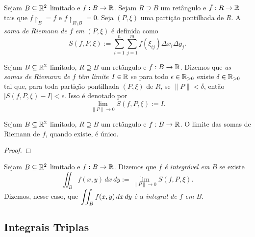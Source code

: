 \begin{definition}
    Sejam $B \subseteq \mathbb{R}^2$ limitado e $f : B \to \mathbb{R}$. Sejam $R \supseteq B$ um retângulo e $\bar{f} : R \to \mathbb{R}$ tais que $\bar{f} \restriction_{B} = f$ e $\bar{f} \restriction_{R \setminus B} = 0$. Seja $(P, \xi)$ uma partição pontilhada de $R$. A \emph{soma de Riemann de $f$ em $(P, \xi)$} é definida como
        \[
            S(f, P, \xi) := \sum_{i=1}^{n} \sum_{j = 1}^{m} \bar{f}(\xi_{ij}) \Delta x_i \Delta y_j.
        \]
\end{definition}

\begin{definition}
    Sejam $B \subseteq \mathbb{R}^2$ limitado, $R \supseteq B$ um retângulo e $f : B \to \mathbb{R}$. Dizemos que \emph{as somas de Riemann de $f$ têm limite $I \in \mathbb{R}$} se para todo $\epsilon \in \mathbb{R}_{>0}$ existe $\delta \in \mathbb{R}_{>0}$ tal que, para toda partição pontilhada $(P, \xi)$ de $R$, se $\|P\| < \delta$, então $|S(f,P,\xi) - I| < \epsilon$. Isso é denotado por
        \[
            \lim_{\|P\| \to 0} S(f,P,\xi) := I.
        \]
\end{definition}

\begin{proposition}
    Sejam $B \subseteq \mathbb{R}^2$ limitado, $R \supseteq B$ um retângulo e $f : B \to \mathbb{R}$. O limite das somas de Riemann de $f$, quando existe, é único.
\end{proposition}

\begin{proof}
    \blackproof
\end{proof}

\begin{definition}
    Sejam $B \subseteq \mathbb{R}^2$ limitado e $f : B \to \mathbb{R}$. Dizemos que \emph{$f$ é integrável em $B$} se existe
        \[
            \iint_{B} f(x,y) \, dx \, dy := \lim_{\|P\| \to 0} S(f,P,\xi).
        \]
    Dizemos, nesse caso, que
        $ \displaystyle
            \iint_{B} f(x,y) \, dx \, dy
        $
    é a \emph{integral de $f$ em $B$}.
\end{definition}

\subsection{Integrais Triplas}


